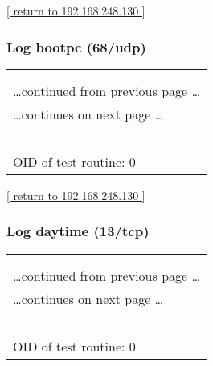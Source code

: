 \documentclass{article}
\begin{document}
\begin{footnotesize}\hyperref[host:192.168.248.130]{[ return to 192.168.248.130 ]}\end{footnotesize}
\subsubsection{Log bootpc (68/udp)}
\label{port:192.168.248.130 bootpc (68/udp) Log}

\begin{longtable}{|p{}|}
\hline
\rowcolor{openvas_log}{\color{white}{Log}}\\
\rowcolor{openvas_log}{\color{white}{NVT: }}\\
\hline
\endfirsthead
\hfill\ldots continued from previous page \ldots \\
\hline
\endhead
\hline
\ldots continues on next page \ldots \\
\endfoot
\hline
\endlastfoot
\\
\rowcolor{white}{\verb=Open port.=}\\
\rowcolor{white}{\verb==}\\
\rowcolor{white}{\verb==}\\
\\
OID of test routine: 0\\
\end{longtable}

\begin{footnotesize}\hyperref[host:192.168.248.130]{[ return to 192.168.248.130 ]}\end{footnotesize}
\subsubsection{Log daytime (13/tcp)}
\label{port:192.168.248.130 daytime (13/tcp) Log}

\begin{longtable}{|p{}|}
\hline
\rowcolor{openvas_log}{\color{white}{Log}}\\
\rowcolor{openvas_log}{\color{white}{NVT: }}\\
\hline
\endfirsthead
\hfill\ldots continued from previous page \ldots \\
\hline
\endhead
\hline
\ldots continues on next page \ldots \\
\endfoot
\hline
\endlastfoot
\\
\rowcolor{white}{\verb=Open port.=}\\
\rowcolor{white}{\verb==}\\
\rowcolor{white}{\verb==}\\
\\
OID of test routine: 0\\
\end{longtable}
\end{document}
